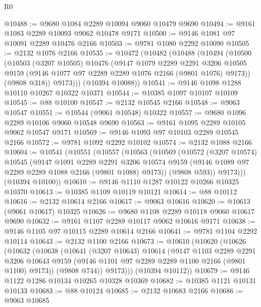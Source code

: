 \begin{lexlean}{R0}
\begin{coremodule}
@10488 := @9680 @1084 @2289 @10094 @9060 @10479 @9690
@10494 := @9161 @1083 @2289 @10093 @9062 @10478 @9171
@10500 := @9146 @1081 @97 @10091 @2289 @10476 @2166
@10503 := @9781 @1080 @2292 @10090
@10505 := @2132 @1076 @2166
@10535 := @10472
    (@10482
      (@10488
        (@10494
          (@10500
            (@10503
              (@3207 @10505)
              @10476
              (@9147
                @1079
                @2289
                @2291
                @3206
                @10505
                @9159
                (@9146 @1077 @97 @2289 @2289 @1076 @2166 (@9801 @1076) @9173))
              (@9808 @318))
            @9173)))
      (@10394 @10088))
@10541 := @9146 @1098 @1288 @10110 @10267 @10322 @10371
@10544 := @10385 @1097 @10107 @10109
@10545 := @88 @10100
@10547 := @2132 @10545 @2166
@10548 := @9063 @10547
@10551 := @10544 (@9061 @10548) @10322
@10557 := @9680 @1096 @2289 @10106 @9060 @10548 @9690
@10563 := @9161 @1095 @2289 @10105 @9062 @10547 @9171
@10569 := @9146 @1093 @97 @10103 @2289 @10545 @2166
@10572 := @9781 @1092 @2292 @10102
@10574 := @2132 @1088 @2166
@10604 := @10541
    (@10551
      (@10557
        (@10563
          (@10569
            (@10572
              (@3207 @10574)
              @10545
              (@9147
                @1091
                @2289
                @2291
                @3206
                @10574
                @9159
                (@9146 @1089 @97 @2289 @2289 @1088 @2166 (@9801 @1088) @9173))
              (@9808 @593))
            @9173)))
      (@10394 @10100))
@10610 := @9146 @1110 @1287 @10122 @10266 @10325 @10370
@10613 := @10385 @1109 @10119 @10121
@10614 := @88 @10112
@10616 := @2132 @10614 @2166
@10617 := @9063 @10616
@10620 := @10613 (@9061 @10617) @10325
@10626 := @9680 @1108 @2289 @10118 @9060 @10617 @9690
@10632 := @9161 @1107 @2289 @10117 @9062 @10616 @9171
@10638 := @9146 @1105 @97 @10115 @2289 @10614 @2166
@10641 := @9781 @1104 @2292 @10114
@10643 := @2132 @1100 @2166
@10673 := @10610
    (@10620
      (@10626
        (@10632
          (@10638
            (@10641
              (@3207 @10643)
              @10614
              (@9147
                @1103
                @2289
                @2291
                @3206
                @10643
                @9159
                (@9146 @1101 @97 @2289 @2289 @1100 @2166 (@9801 @1100) @9173))
              (@9808 @744))
            @9173)))
      (@10394 @10112))
@10679 := @9146 @1122 @1286 @10134 @10265 @10328 @10369
@10682 := @10385 @1121 @10131 @10133
@10683 := @88 @10124
@10685 := @2132 @10683 @2166
@10686 := @9063 @10685

\end{coremodule}
\end{lexlean}
